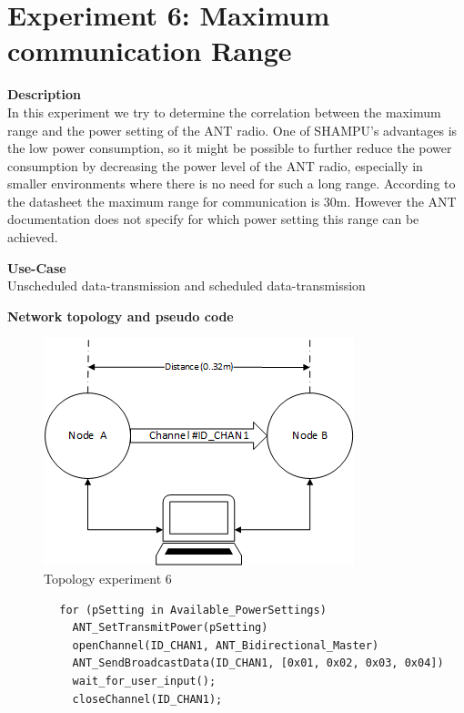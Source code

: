 \section{Experiment 6: Maximum communication Range}
\begin{description} 
	\item{\textbf{Description}} \hfill \\  In this experiment we try to determine the correlation between the maximum range and the power setting of the ANT radio.	One of SHAMPU's advantages is the low power consumption, so it might be possible to further reduce the power consumption by decreasing the power level of the ANT radio, especially in smaller environments where there is no need for such a long range. According to the datasheet the maximum range for communication is 30m. However the ANT documentation does not specify for which power setting this range can be achieved. 
	
	\item{\textbf{Use-Case}} \hfill \\ Unscheduled data-transmission and scheduled data-transmission	
	\item{\textbf{Network topology and pseudo code}} \hfill \\ 
	\begin{figure}[H]
		\centering
		\includegraphics[scale=1]{content/images/exp6_topo.png}
		\caption{Topology experiment 6}
	\end{figure}
	
	\begin{code}[H]
		\begin{verbatim}
		for (pSetting in Available_PowerSettings)
		  ANT_SetTransmitPower(pSetting)
		  openChannel(ID_CHAN1, ANT_Bidirectional_Master)
		  ANT_SendBroadcastData(ID_CHAN1, [0x01, 0x02, 0x03, 0x04])
		  wait_for_user_input();
		  closeChannel(ID_CHAN1);
		\end{verbatim}
		\caption{maximum communication range (Master)}\label{lst:mExp6}
	\end{code}
	

\end{description}

